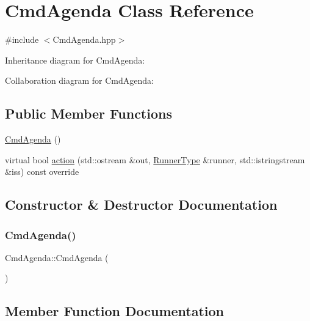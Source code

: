 \hypertarget{classCmdAgenda}{}\section{Cmd\+Agenda Class Reference}
\label{classCmdAgenda}


{\ttfamily \#include $<$Cmd\+Agenda.\+hpp$>$}



Inheritance diagram for Cmd\+Agenda\+:


Collaboration diagram for Cmd\+Agenda\+:
\subsection*{Public Member Functions}
\begin{DoxyCompactItemize}
\item 
\hyperlink{classCmdAgenda_a5433bd5e949c77b69ed255e0baa86c6f}{Cmd\+Agenda} ()
\item 
virtual bool \hyperlink{classCmdAgenda_ab723208cb36623b3d4583e1fae6f22be}{action} (std\+::ostream \&out, \hyperlink{Command_8hpp_ad45c3de597c2023a8be0399d914161f4}{Runner\+Type} \&runner, std\+::istringstream \&iss) const override
\end{DoxyCompactItemize}


\subsection{Constructor \& Destructor Documentation}
\mbox{\label{classCmdAgenda_a5433bd5e949c77b69ed255e0baa86c6f}} 
\subsubsection{\texorpdfstring{Cmd\+Agenda()}{CmdAgenda()}}
{\footnotesize\ttfamily Cmd\+Agenda\+::\+Cmd\+Agenda (\begin{DoxyParamCaption}{ }\end{DoxyParamCaption})}



\subsection{Member Function Documentation}
\mbox{\label{classCmdAgenda_ab723208cb36623b3d4583e1fae6f22be}} 
